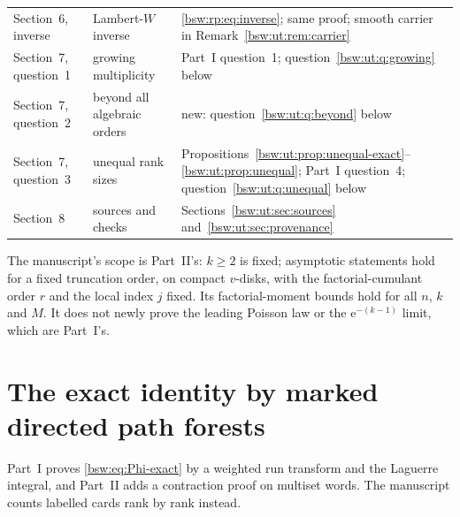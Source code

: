\documentclass[11pt,letterpaper]{article}
\theoremstyle{definition}
\theoremstyle{remark}
\newcommand{\ee}{\mathrm e}
\begin{document}
{\begin{longtable}{>{\raggedright\arraybackslash}p{}>{\raggedright\arraybackslash}p{}>{\raggedright\arraybackslash}p{}}
Section~6, inverse & Lambert-$W$ inverse & \eqref{bsw:rp:eq:inverse}; same
 proof; smooth carrier in Remark~\ref{bsw:ut:rem:carrier}\\
Section~7, question~1 & growing multiplicity & Part~I question~1;
 question~\ref{bsw:ut:q:growing} below\\
Section~7, question~2 & beyond all algebraic orders & new:
 question~\ref{bsw:ut:q:beyond} below\\
Section~7, question~3 & unequal rank sizes &
 Propositions~\ref{bsw:ut:prop:unequal-exact}--\ref{bsw:ut:prop:unequal};
 Part~I question~4; question~\ref{bsw:ut:q:unequal} below\\
Section~8 & sources and checks & Sections~\ref{bsw:ut:sec:sources}
 and~\ref{bsw:ut:sec:provenance}\\
\end{longtable}}

The manuscript's scope is Part~II's: $k\ge2$ is fixed; asymptotic
statements hold for a fixed truncation order, on compact $v$-disks, with
the factorial-cumulant order $r$ and the local index $j$ fixed.  Its
factorial-moment bounds hold for all $n$, $k$ and $M$.  It does not newly
prove the leading Poisson law or the $\ee^{-(k-1)}$ limit, which are
Part~I's.

\section{The exact identity by marked directed path forests}
\label{bsw:ut:sec:forest}

Part~I proves \eqref{bsw:eq:Phi-exact} by a weighted run transform and the
Laguerre integral, and Part~II adds a contraction proof on multiset words.
The manuscript counts labelled cards rank by rank instead.
\end{document}
